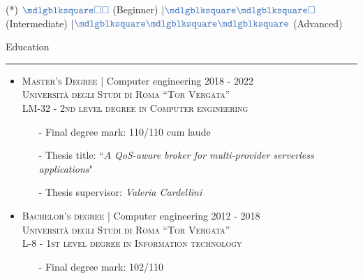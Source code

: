 \documentclass[english,10pt,a4paper]{article}
\newcommand{\CompanyName}[1]{\textsc{{\small #1}}}
\newcommand{\JobTimeRange}[1]{{\scriptsize \textcolor{CvColor!50}{\faCalendar*} \hspace{0.01cm} \textcolor{CvIcon}{#1}}}
\newcommand{\CvSection}[2]{
	\hspace{0.25cm}\textcolor{CvColor!50}{#1} \hspace{0.01cm} \textcolor{CvColor!80}{#2}\\
	\textcolor{CvColor}{\rule[.7\baselineskip]{\textwidth}{1pt}}}
\newcommand{\CvSidebarSection}[2]{
	\textcolor{CvColor!50}{{\footnotesize #1}} \hspace{0.01cm} \textcolor{CvColor!80}{{\footnotesize #2}} \\
	\textcolor{CvColor}{\rule[.7\baselineskip]{0.8\textwidth}{1pt}}}
\newcommand{\FullBlock}{\textcolor{CvColor}{\mdlgblksquare}}
\newcommand{\EmptyBlock}{\textcolor{CvColor}{\square}}
\newcommand{\Sep}{\textcolor{CvColor}{|}\hspace{0.1cm}}
\begin{document}
\begin{paracol}{2}
\begin{tcolorbox}[colback=CvSidebarBackColor,height=\textheight,boxrule=1pt, left=0pt,right=1pt,top=0pt,bottom=0pt, arc=0pt,outer arc=0pt, colframe=CvSidebarBackColor]
\begin{center}
	{\tiny \textcolor{CvColor}{(*)} \hspace{0.05cm} $\FullBlock\EmptyBlock\EmptyBlock$ (Beginner) \Sep $\FullBlock\FullBlock\EmptyBlock$ (Intermediate) \Sep $\FullBlock\FullBlock\FullBlock$ (Advanced)}

\vspace{0.5cm}	


\end{center}
	

	
\end{tcolorbox}
\switchcolumn  %
\begin{tcolorbox}[colback=white, height=\textheight, colframe=white, left=0cm]
		
\vspace{0.3cm}	
\CvSection{\faGraduationCap}{Education}
\begin{itemize}
	\item \CompanyName{Master’s Degree} \textcolor{CvColor}{|} {\scriptsize Computer engineering} \hfill \JobTimeRange{2018 - 2022}\\
	{\scriptsize \textcolor{CvIcon}{\textsc{Università degli Studi di Roma ``Tor Vergata''}}} \\
	{\scriptsize \textcolor{CvIcon}{\textsc{LM-32 - 2nd level degree in Computer engineering}}}
	{\scriptsize \begin{itemize}
			\item[-] Final degree mark: \textcolor{CvColor}{110/110 cum laude}
			\item[-] Thesis title: ``\textit{A QoS-aware broker for multi-provider serverless applications}"
			\item[-] Thesis supervisor: \textit{Valeria Cardellini}	
	\end{itemize}}
	
	\item \CompanyName{Bachelor's degree} \textcolor{CvColor}{|} {\scriptsize Computer engineering} \hfill \JobTimeRange{2012 - 2018}\\
	{\scriptsize \textcolor{CvIcon}{\textsc{Università degli Studi di Roma ``Tor Vergata''}}} \\
	{\scriptsize \textcolor{CvIcon}{\textsc{L-8 - 1st level degree in Information technology}}}
	{\scriptsize \begin{itemize}
			\item[-] Final degree mark: \textcolor{CvColor}{102/110}	
	\end{itemize}}
		



\end{itemize}
\end{tcolorbox}
\end{paracol}
\end{document}
